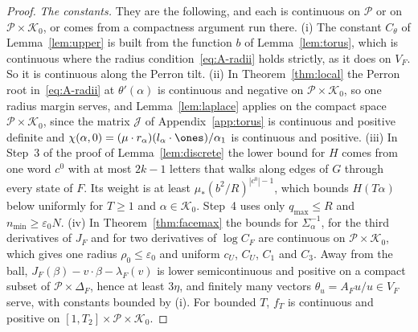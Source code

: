 \begin{proof}
\emph{The constants.} They are the following, and each is continuous on $\mathcal P$ or on
$\mathcal P\times\mathcal K_0$, or comes from a compactness argument run there.
(i) The constant $C_\theta$ of Lemma~\ref{lem:upper} is built from the function $b$ of
Lemma~\ref{lem:torus}, which is continuous where the radius condition~\eqref{eq:A-radii}
holds strictly, as it does on $V_F$. So it is continuous along the Perron tilt.
(ii) In Theorem~\ref{thm:local} the Perron root in~\eqref{eq:A-radii} at $\theta'(\alpha)$ is
continuous and negative on $\mathcal P\times\mathcal K_0$, so one radius margin serves, and
Lemma~\ref{lem:laplace} applies on the compact space $\mathcal P\times\mathcal K_0$, since
the matrix $\mathcal J$ of Appendix~\ref{app:torus} is continuous and positive definite and
$\chi(\alpha,0)=(\mu\cdot r_\alpha)(l_\alpha\cdot\ones)/\alpha_1$ is continuous and positive.
(iii) In Step~3 of the proof of Lemma~\ref{lem:discrete} the lower bound for $H$ comes from
one word $c^0$ with at most $2k-1$ letters that walks along edges of $G$ through every state of
$F$. Its weight is at least $\mu_*(b^2/R)^{|c^0|-1}$, which bounds $H(T\alpha)$ below uniformly
for $T\ge1$ and $\alpha\in\mathcal K_0$. Step~4 uses only $q_{\max}\le R$ and
$n_{\min}\ge\varepsilon_0N$.
(iv) In Theorem~\ref{thm:facemax} the bounds for $\Sigma_\alpha^{-1}$, for the third
derivatives of $J_F$ and for two derivatives of $\log C_F$ are continuous on
$\mathcal P\times\mathcal K_0$, which gives one radius $\rho_0\le\varepsilon_0$ and uniform
$c_U$, $C_U$, $C_1$ and $C_3$. Away from the ball, $J_F(\beta)-v\cdot\beta-\lambda_F(v)$ is
lower semicontinuous and positive on a compact subset of $\mathcal P\times\Delta_F$, hence at
least $3\eta$, and finitely many vectors $\theta_u=A_Fu/u\in V_F$ serve, with constants
bounded by (i). For bounded $T$, $f_T$ is continuous and positive on
$[1,T_2]\times\mathcal P\times\mathcal K_0$.
\end{proof}

